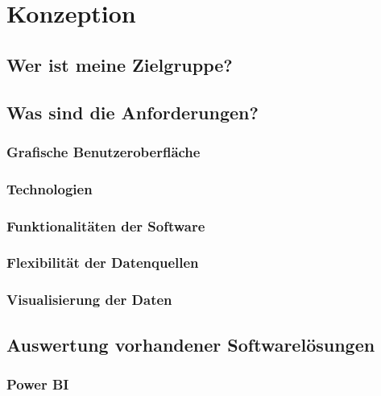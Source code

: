 \chapter{Konzeption}

\section{Wer ist meine Zielgruppe?}

\section{Was sind die Anforderungen?}

\subsection{Grafische Benutzeroberfläche}

\subsection{Technologien}

\subsection{Funktionalitäten der Software}

\subsection{Flexibilität der Datenquellen}

\subsection{Visualisierung der Daten}

\section{Auswertung vorhandener Softwarelösungen}

\subsection{Power BI}

